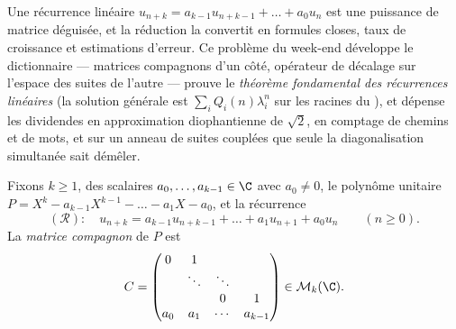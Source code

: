 Une récurrence linéaire $u_{n+k} = a_{k-1}u_{n+k-1} + \dots + a_0 u_n$
est une puissance de matrice déguisée, et la réduction la convertit en
formules closes, taux de croissance et estimations d'erreur. Ce
problème du week-end développe le dictionnaire --- matrices compagnons
d'un côté, opérateur de décalage sur l'espace des suites de l'autre
--- prouve le \emph{théorème fondamental des récurrences linéaires}
(la solution générale est $\sum_i Q_i(n)\lambda_i^n$ sur les racines
du ), et dépense les dividendes en
approximation diophantienne de $\sqrt2$, en comptage de chemins et de
mots, et sur un anneau de suites couplées que seule la diagonalisation
simultanée sait démêler.

\begin{problem}
\label{pb:b2:reduction:1}
Fixons $k \geq 1$, des scalaires $a_0, \dots, a_{k-1} \in \C$ avec
$a_0 \neq 0$, le polynôme unitaire $P = X^k - a_{k-1}X^{k-1} - \dots -
a_1 X - a_0$, et la récurrence
\[
(\mathcal R)\colon\quad u_{n+k} = a_{k-1}u_{n+k-1} + \dots +
a_1 u_{n+1} + a_0 u_n \qquad (n \geq 0).
\]
La \emph{matrice compagnon} de $P$ est
\[
C =
\begin{pmatrix}
0 & 1 & & \\
 & \ddots & \ddots & \\
 & & 0 & 1\\
a_0 & a_1 & \cdots & a_{k-1}
\end{pmatrix}
\in \mathcal{M}_k(\C).
\]


\end{problem}
